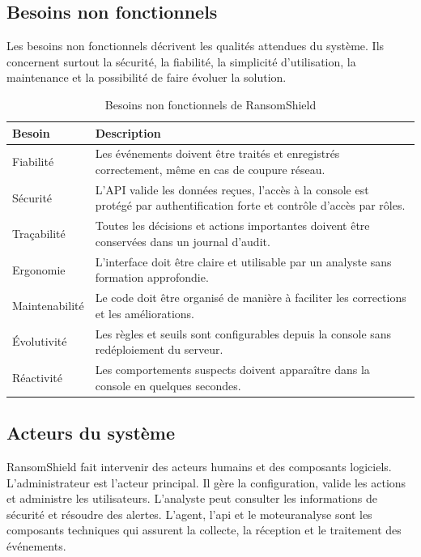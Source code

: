 \subsection{Besoins non fonctionnels}

Les besoins non fonctionnels décrivent les qualités attendues du système. Ils concernent surtout la sécurité, la fiabilité, la simplicité d'utilisation, la maintenance et la possibilité de faire évoluer la solution.

\begin{table}[htbp]
\centering
\caption{Besoins non fonctionnels de RansomShield}
\label{tab:besoins-non-fonctionnels}
\small
\renewcommand{\arraystretch}{1.3}
\begin{tabularx}{\textwidth}{|p{4cm}|X|}
\hline
\textbf{Besoin} & \textbf{Description} \\
\hline
Fiabilité & Les événements doivent être traités et enregistrés correctement, même en cas de coupure réseau. \\
\hline
Sécurité & L'API valide les données reçues, l'accès à la console est protégé par authentification forte et contrôle d'accès par rôles. \\
\hline
Traçabilité & Toutes les décisions et actions importantes doivent être conservées dans un journal d'audit. \\
\hline
Ergonomie & L'interface doit être claire et utilisable par un analyste sans formation approfondie. \\
\hline
Maintenabilité & Le code doit être organisé de manière à faciliter les corrections et les améliorations. \\
\hline
Évolutivité & Les règles et seuils sont configurables depuis la console sans redéploiement du serveur. \\
\hline
Réactivité & Les comportements suspects doivent apparaître dans la console en quelques secondes. \\
\hline
\end{tabularx}
\end{table}

\subsection{Acteurs du système}

RansomShield fait intervenir des acteurs humains et des composants logiciels. L'administrateur est l'acteur principal. Il gère la configuration, valide les actions et administre les utilisateurs. L'analyste peut consulter les informations de sécurité et résoudre des alertes. L'\gls{agent}, l'\gls{api} et le \gls{moteuranalyse} sont les composants techniques qui assurent la collecte, la réception et le traitement des événements.

